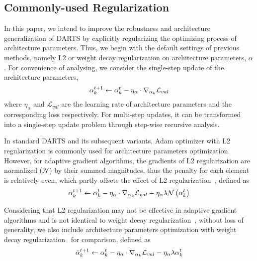 \documentclass[10pt,twocolumn,letterpaper]{article}
\begin{document}
\subsection{Commonly-used Regularization}
In this paper, we intend to improve the robustness and architecture generalization of DARTS by explicitly regularizing the optimizing process of architecture parameters. Thus, we begin with the default settings of previous methods, namely L2 or weight decay regularization on architecture parameters, $\alpha$. For convenience of analysing, we consider the single-step update of the architecture parameters,
\begin{equation} \label{eqn3}
  \begin{split}
    \alpha^{t+1}_k \leftarrow \alpha^{t}_k-\eta_{\alpha} \cdot \nabla_{\alpha_k} \mathcal{L}_{val}
  \end{split}
  \vspace{-6pt}
\end{equation}
where $\eta_{\alpha}$ and $\mathcal{L}_{val}$ are the learning rate of architecture parameters and the corresponding loss respectively. For multi-step updates, it can be transformed into a single-step update problem through step-wise recursive analysis.

In standard DARTS and its subsequent variants, Adam optimizer with L2 regularization is commonly used for architecture parameters optimization. However, for adaptive gradient algorithms, the gradients of L2 regularization are normalized ($\mathcal{N}$) by their summed magnitudes, thus the penalty for each element is relatively even, which partly offsets the effect of L2 regularization~\cite{dwd}, defined as
\begin{equation} \label{eqn4}
  \begin{split}
    \bar{\alpha}^{t+1}_k \leftarrow \alpha^{t}_k-\eta_{\alpha} \cdot \nabla_{\alpha_k} \mathcal{L}_{val}-\eta_{\alpha} \lambda \mathcal{N}\left(\alpha^{t}_k\right)
  \end{split}
  \vspace{-6pt}
\end{equation}

Considering that L2 regularization may not be effective in adaptive gradient algorithms and is not identical to weight decay regularization~\cite{dwd}, without loss of generality, we also include architecture parameters optimization with weight decay regularization~\cite{hanson1988comparing} for comparison, defined as
\begin{equation} \label{eqn6}
  \begin{split}
    \bar{\alpha}^{t+1}_k \leftarrow \alpha^{t}_k-\eta_{\alpha} \cdot \nabla_{\alpha_k} \mathcal{L}_{val}-\eta_{\alpha} \lambda \alpha^{t}_k
  \end{split}
  \vspace{-6pt}
\end{equation}
\end{document}
